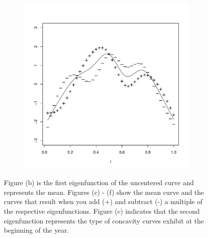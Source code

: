 \begin{figure}
\begin{subfigure}[b]{0.32\textwidth}
                \caption{}
                \label{}
        \end{subfigure}%
        \begin{subfigure}[b]{0.32\textwidth}
                \centering
                \includegraphics[width=0.99\textwidth]{Images-future-work/ef5pn.pdf}
                \caption{}
                \label{}
        \end{subfigure}
        \caption{Figure (b) is the first eigenfunction of the uncentered curve and represents the mean. Figures (c) - (f) show the mean curve and the curves that result when you add (+) and subtract (-) a multiple of the respective eigenfunctions. Figure (c) indicates that the second eigenfunction represents the type of concavity curves exhibit at the beginning of the year.}
        \label{fig:interpreting eigenfunctions}
\end{figure}

